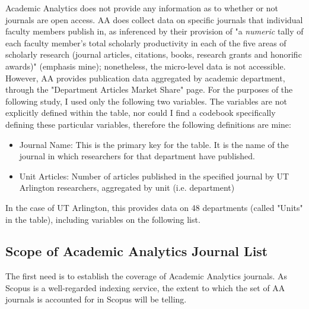 \documentclass{article}
\begin{document}
Academic Analytics does not provide any information as to whether or not journals are open access. 
AA does collect data on specific journals that individual faculty members publish in, as inferenced by their provision of "a \textit{numeric} tally of each faculty member’s total scholarly productivity in each of the five areas of scholarly research (journal articles, citations, books, research grants and honorific awards)" (emphasis mine); nonetheless, the micro-level data is not accessible. 
However, AA provides publication data aggregated by academic department, through the "Department Articles Market Share" page. 
For the purposes of the following study, I used only the following two variables.                             
The variables are not explicitly defined within the table, nor could I find a codebook specifically defining these particular variables, therefore the following definitions are mine:
\begin{itemize}
	\item Journal Name: This is the primary key for the table. It is the name of the journal in which researchers for that department have published.
	\item Unit Articles: Number of articles published in the specified journal by UT Arlington researchers, aggregated by unit (i.e. department)
\end{itemize}

 In the case of UT Arlington, this provides data on 48 departments (called "Units" in the table), including variables on the following list. 


\subsection{Scope of Academic Analytics Journal List}
The first need is to establish the coverage of Academic Analytics journals.
As Scopus is a well-regarded indexing service, the extent to which the set of AA journals is accounted for in Scopus will be telling.
\end{document}
